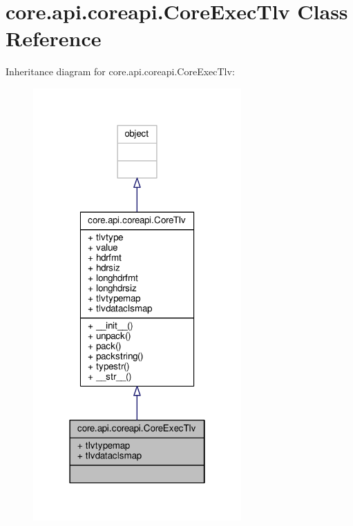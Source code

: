 \hypertarget{classcore_1_1api_1_1coreapi_1_1_core_exec_tlv}{\section{core.\+api.\+coreapi.\+Core\+Exec\+Tlv Class Reference}
\label{classcore_1_1api_1_1coreapi_1_1_core_exec_tlv}
}


Inheritance diagram for core.\+api.\+coreapi.\+Core\+Exec\+Tlv\+:
\nopagebreak
\begin{figure}[H]
\begin{center}
\leavevmode
\includegraphics[width=226pt]{classcore_1_1api_1_1coreapi_1_1_core_exec_tlv__inherit__graph}
\end{center}
\end{figure}


